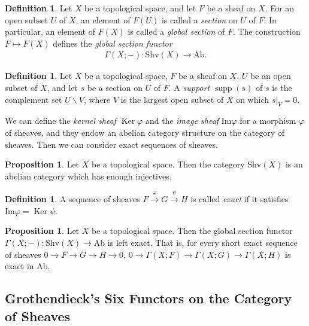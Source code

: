\documentclass[a4paper,dvipdfmx,11pt,reqno]{amsart}
\DeclareMathOperator{\supp}{supp}
\DeclareMathOperator{\Ker}{Ker}
\renewcommand{\Im}{\mathrm{Im}}
\newcommand{\Ab}{\mathrm{Ab}}
\newcommand{\Shv}{\mathrm{Shv}}
\theoremstyle{definition}
\newtheorem{definition}[theorem]{Definition}
\newtheorem{proposition}[theorem]{Proposition}
\begin{document}
\begin{definition}
  Let $X$ be a topological space, and let $F$ be a sheaf on $X$.
  For an open subset $U$ of $X$, an element of $F(U)$ is called a \textit{section} on $U$ of $F$.
  In particular, an element of $F(X)$ is called a \textit{global section} of $F$.
  The construction $F \mapsto F(X)$ defines the \textit{global section functor}
  \begin{align*}
    \Gamma(X;-) : \Shv(X) \to \Ab.
  \end{align*}
\end{definition}

\begin{definition}
  Let $X$ be a topological space, $F$ be a sheaf on $X$, $U$ be an open subset of $X$, and let $s$ be a section on $U$ of $F$.
  A \textit{support} $\supp(s)$ of $s$ is the complement set $U \backslash V$, where $V$ is the largest open subset of $X$ on which $s|_{V}=0$.
\end{definition}

We can define the \textit{kernel sheaf} $\Ker \varphi$ and the \textit{image sheaf} $\Im \varphi$ for a morphism $\varphi$ of sheaves, and they endow an abelian category structure on the category of sheaves.
Then we can consider exact sequences of sheaves.

\begin{proposition}
  Let $X$ be a topological space.
  Then the category $\Shv(X)$ is an abelian category which has enough injectives.
\end{proposition}

\begin{definition}
  A sequence of sheaves $F \xrightarrow{\varphi} G \xrightarrow{\psi} H$ is called \textit{exact} if it satisfies $\Im \varphi = \Ker \psi$.
\end{definition}

\begin{proposition}
  Let $X$ be a topological space.
  Then the global section functor $\Gamma(X;-) : \Shv(X) \to \Ab$ is left exact.
  That is, for every short exact sequence of sheaves $0 \to F \to G \to H \to 0$, $0 \to \Gamma(X;F) \to \Gamma(X;G) \to \Gamma(X;H)$ is exact in $\Ab$.
\end{proposition}

\subsection{Grothendieck's Six Functors on the Category of Sheaves} \label{subsec.six_operations_on_the_category}
\end{document}
